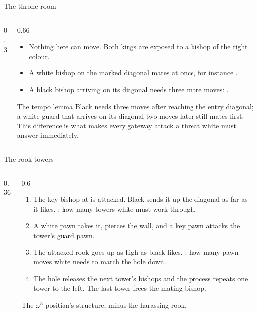 \documentclass[aspectratio=169,10pt]{beamer}
\newcommand{\EHP}{[EHP17]}
\begin{document}
\begin{frame}{The throne room}
  \begin{columns}[T]
    \begin{column}{0.3\textwidth}
      \credit{Figure 2 of \EHP.}
    \end{column}
    \begin{column}{0.66\textwidth}
      \begin{itemize}
        \item Nothing here can move. Both kings are exposed to a bishop of the right colour.
        \item A white bishop on the marked diagonal mates at once, for instance .
        \item A black bishop arriving on its diagonal needs three more moves:
          .
      \end{itemize}
      \begin{alertblock}{The tempo lemma}
        Black needs three moves after reaching the entry diagonal; a white guard that arrives on its
        diagonal two moves later still mates first. This difference is what makes every gateway attack a
        threat white must answer immediately.
      \end{alertblock}
    \end{column}
  \end{columns}
\end{frame}

\begin{frame}{The rook towers}
  \begin{columns}[T]
    \begin{column}{0.36\textwidth}
      \credit{Figure 3 of \EHP.}
    \end{column}
    \begin{column}{0.6\textwidth}
      \begin{enumerate}
        \item The key bishop at  is attacked. Black sends it up the diagonal as far as it likes.
          : how many towers white must work through.
        \item A white pawn takes it, pierces the wall, and a key pawn attacks the tower's guard pawn.
        \item The attacked rook goes up as high as black likes. : how many pawn
          moves white needs to march the hole down.
        \item The hole releases the next tower's bishops and the process repeats one tower to the left.
          The last tower frees the mating bishop.
      \end{enumerate}
      The $\omega^3$ position's structure, minus the harassing rook.
    \end{column}
  \end{columns}
\end{frame}
\end{document}

